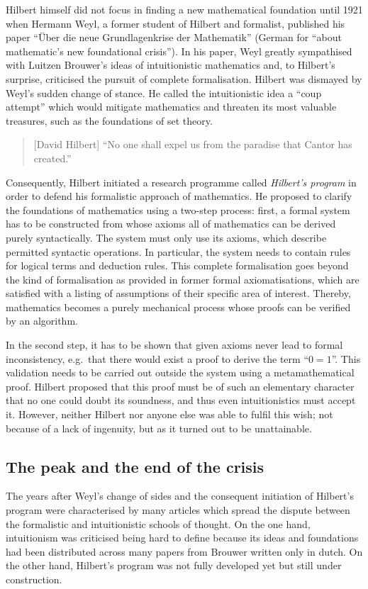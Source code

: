 \documentclass[hidelinks]{article}
\begin{document}
Hilbert himself did not focus in finding a new mathematical foundation until 1921 when Hermann Weyl, a former student of Hilbert and formalist, published his paper ``Über die neue Grundlagenkrise der Mathematik'' (German for ``about mathematic's new foundational crisis''). In his paper, Weyl greatly sympathised with Luitzen Brouwer's ideas of intuitionistic mathematics and, to Hilbert's surprise, criticised the pursuit of complete formalisation. Hilbert was dismayed by Weyl's sudden change of stance. He called the intuitionistic idea a ``coup attempt'' which would mitigate mathematics and threaten its most valuable treasures, such as the foundations of set theory.\cite{hilbert_coup}
\begin{quote}[David Hilbert]
``No one shall expel us from the paradise that Cantor has created.''\cite{hilbert_paradise}
\end{quote}
Consequently, Hilbert initiated a research programme called \textit{Hilbert's program} in order to defend his formalistic approach of mathematics. He proposed to clarify the foundations of mathematics using a two-step process: first, a formal system has to be constructed from whose axioms all of mathematics can be derived purely syntactically. The system must only use its axioms, which describe permitted syntactic operations. In particular, the system needs to contain rules for logical terms and deduction rules. This complete formalisation goes beyond the kind of formalisation as provided in former formal axiomatisations, which are satisfied with a listing of assumptions of their specific area of interest. Thereby, mathematics becomes a purely mechanical process whose proofs can be verified by an algorithm.

In the second step, it has to be shown that given axioms never lead to formal inconsistency, e.g.\ that there would exist a proof to derive the term ``$0=1$''. This validation needs to be carried out outside the system using a metamathematical proof. Hilbert proposed that this proof must be of such an elementary character that no one could doubt its soundness, and thus even intuitionistics must accept it. However, neither Hilbert nor anyone else was able to fulfil this wish; not because of a lack of ingenuity, but as it turned out to be unattainable.


\subsection{The peak and the end of the crisis}\label{ssec_end_crisis}
The years after Weyl's change of sides and the consequent initiation of Hilbert's program were characterised by many articles which spread the dispute between the formalistic and intuitionistic schools of thought. On the one hand, intuitionism was criticised being hard to define because its ideas and foundations had been distributed across many papers from Brouwer written only in dutch. On the other hand, Hilbert's program was not fully developed yet but still under construction.
\end{document}
